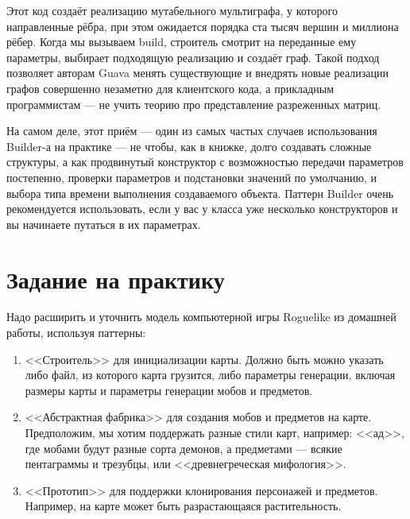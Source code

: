 \documentclass{../../text-style}
\begin{document}
Этот код создаёт реализацию мутабельного мультиграфа, у которого направленные рёбра, при этом ожидается порядка ста тысяч вершин и миллиона рёбер. Когда мы вызываем build, строитель смотрит на переданные ему параметры, выбирает подходящую реализацию и создаёт граф. Такой подход позволяет авторам Guava менять существующие и внедрять новые реализации графов совершенно незаметно для клиентского кода, а прикладным программистам --- не учить теорию про представление разреженных матриц.

На самом деле, этот приём --- один из самых частых случаев использования Builder-а на практике --- не чтобы, как в книжке, долго создавать сложные структуры, а как продвинутый конструктор с возможностью передачи параметров постепенно, проверки параметров и подстановки значений по умолчанию, и выбора типа времени выполнения создаваемого объекта. Паттерн Builder очень рекомендуется использовать, если у вас у класса уже несколько конструкторов и вы начинаете путаться в их параметрах.

\section{Задание на практику}

Надо расширить и уточнить модель компьютерной игры Roguelike из домашней работы, используя паттерны:

\begin{enumerate}
    \item <<Строитель>> для инициализации карты. Должно быть можно указать либо файл, из которого карта грузится, либо параметры генерации, включая размеры карты и параметры генерации мобов и предметов.
    \item <<Абстрактная фабрика>> для создания мобов и предметов на карте. Предположим, мы хотим поддержать разные стили карт, например: <<ад>>, где мобами будут разные сорта демонов, а предметами --- всякие пентаграммы и трезубцы, или <<древнегреческая мифология>>.
    \item <<Прототип>> для поддержки клонирования персонажей и предметов. Например, на карте может быть разрастающаяся растительность.
\end{enumerate}
\end{document}
